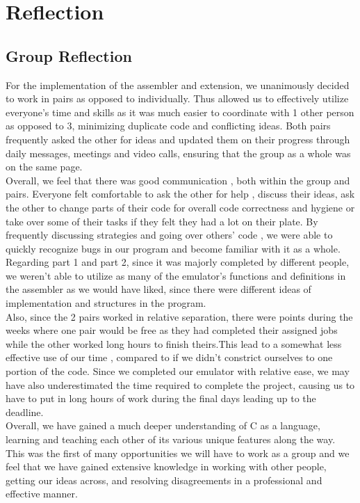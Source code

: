 \documentclass[11pt, letterpaper]{article}
\begin{document}
\section{Reflection}
\subsection{Group Reflection}
For the implementation of the assembler and extension, we unanimously decided to work in pairs as opposed to individually. Thus allowed us to effectively utilize everyone's time and skills as it was much easier to coordinate with 1 other person as opposed to 3, minimizing duplicate code and conflicting ideas. Both pairs frequently asked the other for ideas and updated them on their progress through daily messages, meetings and video calls, ensuring that the group as a whole was on the same page.
\\ \newline
Overall, we feel that there was good communication , both within the group and pairs. Everyone felt comfortable to ask the other for help , discuss their ideas, ask the other to change parts of their code for overall code correctness and hygiene or take over some of their tasks if they felt they had a lot on their plate. By frequently discussing strategies and going over others' code , we were able to quickly recognize bugs in our program and become familiar with it as a whole.
\\ \newline
Regarding part 1 and part 2, since it was majorly completed by different people, we weren't able to utilize as many of the emulator's functions and definitions in the assembler as we would have liked, since there were different ideas of implementation and structures in the program.
\\ \newline
Also, since the 2 pairs worked in relative separation, there were points during the weeks where one pair would be free as they had completed their assigned jobs while the other worked long hours to finish theirs.This lead to a somewhat less effective use of our time , compared to if we didn't constrict ourselves to one portion of the code.
Since we completed our emulator with relative ease, we may have also underestimated the time required to complete the project, causing us to have to put in long hours of work during the final days leading up to the deadline.
\\ \newline
Overall, we have gained a much deeper understanding of C as a language, learning and teaching each other of its various unique features along the way. This was the first of many opportunities we will have to work as a group and we feel that we have gained extensive knowledge in working with other people, getting our ideas across, and resolving disagreements in a professional and effective manner.
\end{document}
